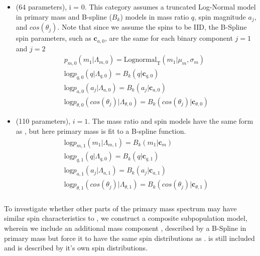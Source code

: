 \begin{itemize}
    \item \first{} (64 parameters), i = 0. This category assumes a truncated Log-Normal model in primary mass and B-spline ($B_k$) models in mass ratio $q$, spin magnitude $a_j$, and $cos(\theta_j)$. Note that since we assume the spins to be IID, the B-Spline spin parameters, such as $\mathbf{c}_{a,0}$, are the same for each binary component $j=1$ and $j=2$
    \begin{eqnarray} \label{eq:peakAbase}
        p_{m,0}(m_1| \Lambda_{m,0}) = \text{Lognormal}_\text{T}(m_1 | \mu_{m}, \sigma_{m}) \\
        \text{log} p_{q,0}(q| \Lambda_{q,0}) = B_k(q | \mathbf{c}_{q,0}) \\
        \text{log} p_{a,0}(a_j| \Lambda_{a,0}) = B_k(a_j | \mathbf{c}_{a,0}) \\
        \text{log} p_{\theta,0}(cos(\theta_j)| \Lambda_{\theta,0}) = B_k( cos(\theta_j) | \mathbf{c}_{\theta,0})
    \end{eqnarray}

    \item \contB{} (110 parameters), $i=1$. The mass ratio and spin models have the same form as \first{}, but here primary mass is fit to a B-spline function. 
    \begin{eqnarray} \label{eq:contBbase}
        \text{log} p_{m,1}(m_1| \Lambda_{m,1}) = B_k(m_1 | \mathbf{c}_{m}) \\
        \text{log} p_{q,1}(q| \Lambda_{q,0}) = B_k(q | \mathbf{c}_{q,1}) \\
        \text{log} p_{a,1}(a_j| \Lambda_{a,1}) = B_k(a_j | \mathbf{c}_{a,1}) \\
        \text{log} p_{\theta,1}(cos(\theta_j)| \Lambda_{\theta,1}) = B_k( cos(\theta_j) | \mathbf{c}_{\theta,1})
    \end{eqnarray}

\end{itemize}

\subsubsection{\comp{}}

To investigate whether other parts of the primary mass spectrum may have similar spin characteristics to \first{}, we construct a composite subpopulation model, wherein we include an additional mass component \contA{}, described by a B-Spline in primary mass but force it to have the same spin distributions as \first{}. \contB{} is still included and is described by it's own spin distributions.

